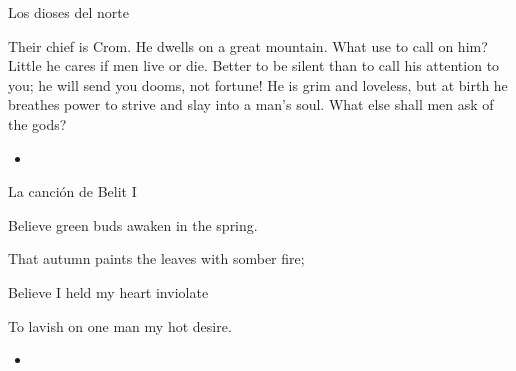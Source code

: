 \begin{frame}{Los dioses del norte}
	\begin{exampleblock}{}
		Their chief is Crom. He dwells on a great mountain. What use to call on him? Little he cares if men live or die. Better to be silent than to call his attention to you; he will send you dooms, not fortune! He is grim and loveless, but at birth he breathes power to strive and slay into a man’s soul. What else shall men ask of the gods?
	\end{exampleblock}

	\begin{itemize}
		\item \textit{  }
	\end{itemize}
\end{frame}
\note[itemize]{
	\item
}

\begin{frame}{La canción de Belit I}
	\begin{exampleblock}{}
		Believe green buds awaken in the spring.

		That autumn paints the leaves with somber fire;

		Believe I held my heart inviolate

		To lavish on one man my hot desire.
	\end{exampleblock}

	\begin{itemize}
		\item \textit{  }
	\end{itemize}
\end{frame}
\note[itemize]{
	\item
}

